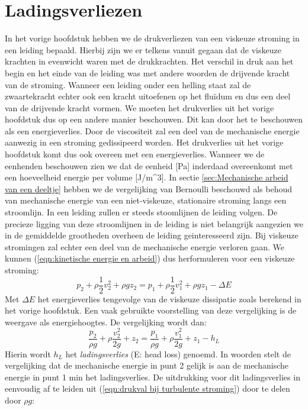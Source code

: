 	\section{Ladingsverliezen}
	\label{sec:Ladingsverliezen}
In het vorige hoofdstuk hebben we de drukverliezen van een viskeuze stroming in een leiding bepaald. Hierbij zijn we er telkens vanuit gegaan dat de viskeuze krachten in evenwicht waren met de drukkrachten. Het verschil in druk aan het begin en het einde van de leiding was met andere woorden de drijvende kracht van de stroming. Wanneer een leiding onder een helling staat zal de zwaartekracht echter ook een kracht uitoefenen op het flu\"idum en dus een deel van de drijvende kracht vormen. We moeten het drukverlies uit het vorige hoofdstuk dus op een andere manier beschouwen. Dit kan door het te beschouwen als een energieverlies. Door de viscositeit zal een deel van de mechanische energie aanwezig in een stroming gedissipeerd worden. Het drukverlies uit het vorige hoofdstuk komt dus ook overeen met een energieverlies. Wanneer we de eenhenden beschouwen zien we dat de eenheid [\unit{}{Pa}] inderdaad overeenkomt met een hoeveelheid energie per volume [\unit{}{J/m^3}].
\npar
In sectie \ref{sec:Mechanische arbeid van een deeltje} hebben we de vergelijking van Bernoulli beschouwd als behoud van mechanische energie van een niet-viskeuze, stationaire stroming langs een stroomlijn. In een leiding zullen er steeds stoomlijnen de leiding volgen. De precieze ligging van deze stroomlijnen in de leiding is niet belangrijk aangezien we in de gemiddelde grootheden overheen de leiding geinteresseerd zijn. Bij viskeuze stromingen zal echter een deel van de mechanische energie verloren gaan. We kunnen (\ref{eqn:kinetische energie en arbeid}) dus herformuleren voor een viskeuze stroming:
\begin{equation}
	p_2 + \rho \frac{1}{2} v_2^2 + \rho g z_2 = p_1 + \rho \frac{1}{2} v_1^2 + \rho g z_1 - \Delta E
\end{equation}
Met $\Delta E$ het energieverlies tengevolge van de viskeuze dissipatie zoals berekend in het vorige hoofdstuk. Een vaak gebruikte voorstelling van deze vergelijking is de weergave als energiehoogtes. De vergelijking wordt dan:
\begin{equation}
	\frac{p_2}{\rho g} + \rho \frac{v_2^2}{2 g}  + z_2 = \frac{p_1}{\rho g} + \rho \frac{v_1^2}{2 g}  + z_1 - h_L
\end{equation}
Hierin wordt $h_L$ het \emph{ladingsverlies} (E: head loss) genoemd. In woorden stelt de vergelijking dat de mechanische energie in punt 2 gelijk is aan de mechanische energie in punt 1 min het ladingsverlies. De uitdrukking voor dit ladingsverlies in eenvoudig af te leiden uit (\ref{eqn:drukval bij turbulente stroming}) door te delen door $\rho g$:
